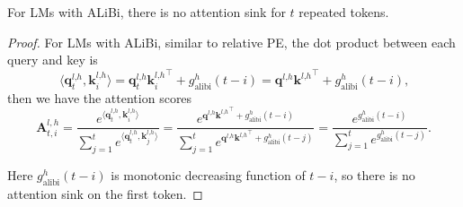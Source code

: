 \begin{proposition}\label{prop3}
    For LMs with ALiBi, there is no attention sink for $t$ repeated tokens.
\end{proposition}
\begin{proof}
    For LMs with ALiBi, similar to relative PE, the dot product between each query and key is
\begin{equation}
\langle\boldsymbol{q}_t^{l\textrm{,}h}\textrm{,}\,\boldsymbol{k}_i^{l\textrm{,}h}\rangle=\boldsymbol{q}_t^{l\textrm{,}h}{\boldsymbol{k}_i^{l\textrm{,}h}}^\top + g_{\textrm{alibi}}^h(t-i)=\boldsymbol{q}^{l\textrm{,}h}{\boldsymbol{k}^{l\textrm{,}h}}^\top + g_{\textrm{alibi}}^h(t-i)\textrm{,}
\end{equation}
then we have the attention scores
\begin{equation}
\boldsymbol{A}_{t\textrm{,}\,i}^{l\textrm{,}\,h}=\frac{e^{\langle\boldsymbol{q}_t^{l\textrm{,}h}\textrm{,}\,\boldsymbol{k}_i^{l\textrm{,}h}\rangle}}{\sum_{j=1}^t e^{\langle\boldsymbol{q}_t^{l\textrm{,}h}\textrm{,}\,\boldsymbol{k}_j^{l\textrm{,}h}\rangle}}=\frac{e^{\boldsymbol{q}^{l\textrm{,}h}{\boldsymbol{k}^{l\textrm{,}h}}^\top+g_{\textrm{alibi}}^h(t-i)}}{\sum_{j=1}^te^{\boldsymbol{q}^{l\textrm{,}h}{\boldsymbol{k}^{l\textrm{,}h}}^\top+g_{\textrm{alibi}}^h(t-j)}}=\frac{e^{g_{\textrm{alibi}}^h(t-i)}}{\sum_{j=1}^te^{g_{\textrm{alibi}}^h(t-j)}}\textrm{.}
\end{equation}

Here $g_{\textrm{alibi}}^h(t-i)$ is monotonic decreasing function of $t-i$, so there is no attention sink on the first token. 
\end{proof}

